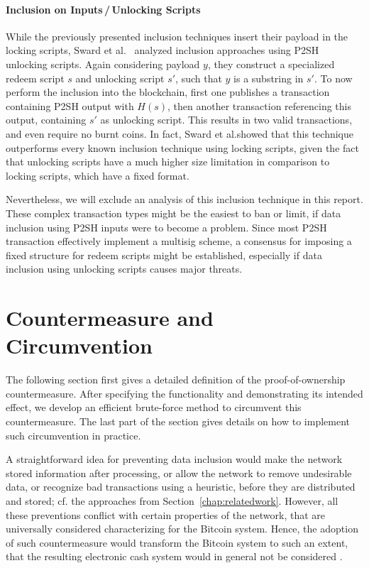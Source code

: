 \documentclass[a4paper,11pt,titlepage]{scrbook}
\begin{document}
\subsubsection*{Inclusion on Inputs\,/\,Unlocking Scripts}
While the previously presented inclusion techniques insert their payload in the locking scripts, Sward et al.~\cite{sward_data_2018} analyzed inclusion approaches using P2SH unlocking scripts.
Again considering payload $y$, they construct a specialized redeem script $s$ and unlocking script $s'$, such that $y$ is a substring in $s'$.
To now perform the inclusion into the blockchain, first one publishes a transaction containing P2SH output with $H(s)$, then another transaction referencing this output, containing $s'$ as unlocking script.
This results in two valid transactions, and even require no burnt coins.
In fact, Sward et al.\@ showed that this technique outperforms every known inclusion technique using locking scripts, given the fact that unlocking scripts have a much higher size limitation in comparison to locking scripts, which have a fixed format.

Nevertheless, we will exclude an analysis of this inclusion technique in this report.
These complex transaction types might be the easiest to ban or limit, if data inclusion using P2SH inputs were to become a problem.
Since most P2SH transaction effectively implement a multisig scheme, a consensus for imposing a fixed structure for redeem scripts might be established, especially if data inclusion using unlocking scripts causes major threats.



\chapter{Countermeasure and Circumvention}\label{chap:countermeasure}

The following section first gives a detailed definition of the proof-of-ownership countermeasure. After specifying the functionality and demonstrating its intended effect, we develop an efficient brute-force method to circumvent this countermeasure. The last part of the section gives details on how to implement such circumvention in practice.

A straightforward idea for preventing data inclusion would make the network  stored information after processing, or allow the network to remove undesirable data, or recognize bad transactions using a heuristic, before they are distributed and stored; cf. the approaches from Section~\ref{chap:relatedwork}.
However, all these preventions conflict with certain properties of the network, that are universally considered characterizing for the Bitcoin system.
Hence, the adoption of such countermeasure would transform the Bitcoin system to such an extent, that the resulting electronic cash system would in general not be considered .
\end{document}
